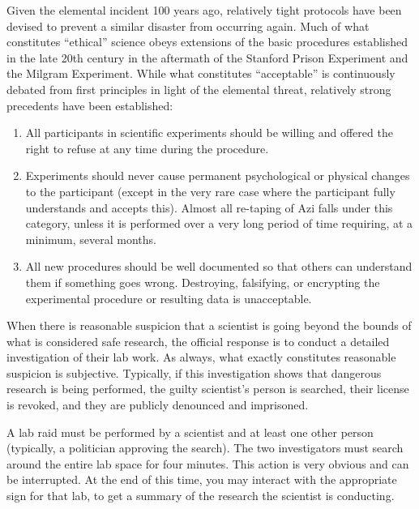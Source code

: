 \documentclass[green]{elementals}
\begin{document}
\name{\gEthics{}}

Given the elemental incident 100 years ago, relatively tight protocols have been devised to prevent a similar disaster from occurring again. Much of what constitutes ``ethical'' science obeys extensions of the basic procedures established in the late 20th century in the aftermath of the Stanford Prison Experiment and the Milgram Experiment. While what constitutes ``acceptable'' is continuously debated from first principles in light of the elemental threat, relatively strong precedents have been established:

\begin{enumerate}
\item All participants in scientific experiments should be willing and offered the right to refuse at any time during the procedure.
\item Experiments should never cause permanent psychological or physical changes to the participant (except in the very rare case where the participant fully understands and accepts this). Almost all re-taping of Azi falls under this category, unless it is performed over a very long period of time requiring, at a minimum, several months.
\item All new procedures should be well documented so that others can understand them if something goes wrong. Destroying, falsifying, or encrypting the experimental procedure or resulting data is unacceptable.
\end{enumerate}

When there is reasonable suspicion that a scientist is going beyond the bounds of what is considered safe research, the official response is to conduct a detailed investigation of their lab work. As always, what exactly constitutes reasonable suspicion is subjective. Typically, if this investigation shows that dangerous research is being performed, the guilty scientist's person is searched, their license is revoked, and they are publicly denounced and imprisoned.

A lab raid must be performed by a scientist and at least one other person (typically, a politician approving the search). The two investigators must search around the entire lab space for four minutes. This action is very obvious and can be interrupted. At the end of this time, you may interact with the appropriate sign for that lab, to get a summary of the research the scientist is conducting.
\end{document}
